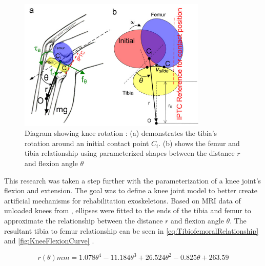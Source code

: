 \begin{figure}[h!]
    \centering
    \includegraphics[width=0.8\textwidth]{Figures/Background/KneeParameterization.png}
    \caption{Diagram showing knee rotation \cite{KinDynKneeJoint}: (a) demonstrates the tibia's rotation around an initial contact point \(C_i\). (b) shows the femur and tibia relationship using parameterized shapes between the distance \(r\) and flexion angle \(\theta\)}
    \label{fig:KneeParameterization}
\end{figure}

This research was taken a step further with the parameterization of a knee joint's flexion and extension. The goal was to define a knee joint model to better create artificial mechanisms for rehabilitation exoskeletons. Based on MRI data of unloaded knees from \cite{MRIKneeShape_Unloaded}, ellipses were fitted to the ends of the tibia and femur to approximate the relationship between the distance \(r\) and flexion angle \(\theta\). The resultant tibia to femur relationship can be seen in \autoref{eq:TibiofemoralRelationship} and \autoref{fig:KneeFlexionCurve} \cite{KinDynKneeJoint}.

\begin{equation}
    r(\theta) mm = 1.078\theta^4 - 11.184\theta^3 + 26.524\theta^2 - 0.825\theta + 263.59
    \label{eq:TibiofemoralRelationship}
\end{equation}


